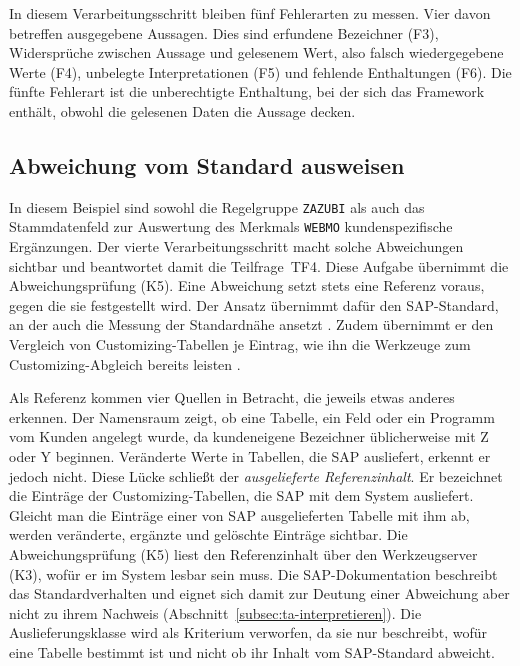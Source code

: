 In diesem Verarbeitungsschritt bleiben fünf Fehlerarten zu messen. Vier davon betreffen ausgegebene Aussagen. Dies sind erfundene Bezeichner (F3), Widersprüche zwischen Aussage und gelesenem Wert, also falsch wiedergegebene Werte (F4), unbelegte Interpretationen (F5) und fehlende Enthaltungen (F6). Die fünfte Fehlerart ist die unberechtigte Enthaltung, bei der sich das Framework enthält, obwohl die gelesenen Daten die Aussage decken. %

\subsection{Abweichung vom Standard ausweisen}
\label{subsec:ta-abweichung}

In diesem Beispiel sind sowohl die Regelgruppe \texttt{ZAZUBI} als auch das Stammdatenfeld zur Auswertung des Merkmals \texttt{WEBMO} kundenspezifische Ergänzungen. Der vierte Verarbeitungsschritt macht solche Abweichungen sichtbar und beantwortet damit die Teilfrage~TF4. Diese Aufgabe übernimmt die Abweichungsprüfung (K5). Eine Abweichung setzt stets eine Referenz voraus, gegen die sie festgestellt wird. Der Ansatz übernimmt dafür den SAP-Standard, an der auch die Messung der Standardnähe ansetzt \cite{sekatzek_messung_2009}. Zudem übernimmt er den Vergleich von Customizing-Tabellen je Eintrag, wie ihn die Werkzeuge zum Customizing-Abgleich bereits leisten \cite{sap_customizing_nodate}. 

Als Referenz kommen vier Quellen in Betracht, die jeweils etwas anderes erkennen. Der Namensraum zeigt, ob eine Tabelle, ein Feld oder ein Programm vom Kunden angelegt wurde, da kundeneigene Bezeichner üblicherweise mit Z oder Y beginnen. %
Veränderte Werte in Tabellen, die SAP ausliefert, erkennt er jedoch nicht. Diese Lücke schließt der \emph{ausgelieferte Referenzinhalt}. Er bezeichnet die Einträge der Customizing-Tabellen, die SAP mit dem System ausliefert. Gleicht man die Einträge einer von SAP ausgelieferten Tabelle mit ihm ab, werden veränderte, ergänzte und gelöschte Einträge sichtbar. Die Abweichungsprüfung (K5) liest den Referenzinhalt über den Werkzeugserver (K3), wofür er im System lesbar sein muss. %
Die SAP-Dokumentation beschreibt das Standardverhalten und eignet sich damit zur Deutung einer Abweichung aber nicht zu ihrem Nachweis (Abschnitt~\ref{subsec:ta-interpretieren}). Die Auslieferungsklasse wird als Kriterium verworfen, da sie nur beschreibt, wofür eine Tabelle bestimmt ist und nicht ob ihr Inhalt vom SAP-Standard abweicht.

